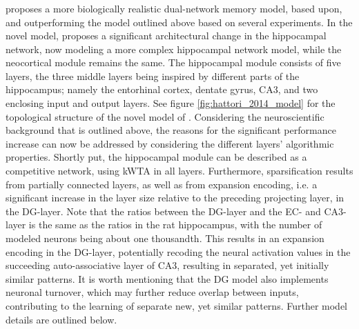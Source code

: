 \subsubsection{\cite{Hattori2014}}
\cite{Hattori2014} proposes a more biologically realistic dual-network memory model, based upon, and outperforming the model outlined above based on several experiments. In the novel model, \cite{Hattori2014} proposes a significant architectural change in the hippocampal network, now modeling a more complex hippocampal network model, while the neocortical module remains the same. The hippocampal module consists of five layers, the three middle layers being inspired by different parts of the hippocampus; namely the entorhinal cortex, dentate gyrus, CA3, and two enclosing input and output layers. See figure \ref{fig:hattori_2014_model} for the topological structure of the novel model of \cite{Hattori2014}. 
Considering the neuroscientific background that is outlined above, the reasons for the significant performance increase can now be addressed by considering the different layers' algorithmic properties. 
Shortly put, the hippocampal module can be described as a competitive network, using kWTA in all layers. Furthermore, sparsification results from partially connected layers, as well as from expansion encoding, i.e. a significant increase in the layer size relative to the preceding projecting layer, in the DG-layer. Note that the ratios between the DG-layer and the EC- and CA3-layer is the same as the ratios in the rat hippocampus, with the number of modeled neurons being about one thousandth. This results in an expansion encoding in the DG-layer, potentially recoding the neural activation values in the succeeding auto-associative layer of CA3, resulting in separated, yet initially similar patterns. It is worth mentioning that the DG model also implements neuronal turnover, which may further reduce overlap between inputs, contributing to the learning of separate new, yet similar patterns. Further model details are outlined below.


